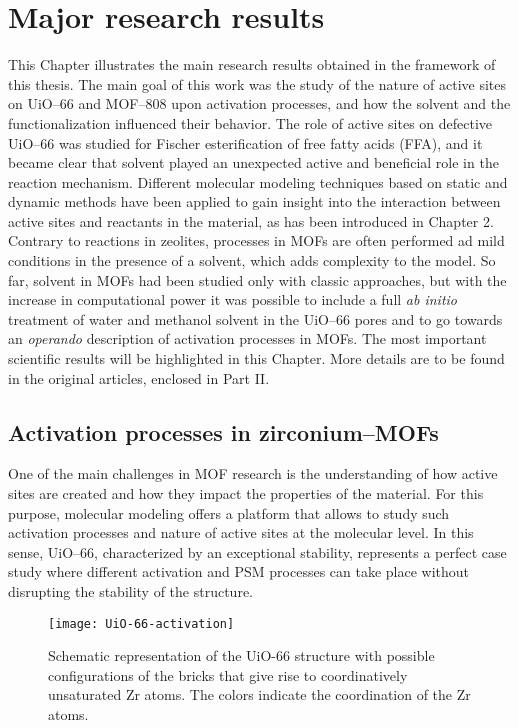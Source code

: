 \graphicspath{{figures/chapter3/}}
\renewcommand\evenpagerightmark{{\scshape\small Major research results}}
\renewcommand\oddpageleftmark{{\scshape\small Chapter 3}}

\hyphenation{}
\chapter[Major research results]%
{Major research results}
\label{ch3}
This Chapter illustrates the main research results obtained in the framework of this thesis. The main goal of this work was the study of the nature of active sites on UiO--66 and MOF--808 upon activation processes, and how the solvent and the functionalization influenced their behavior. The role of active sites on defective UiO--66 was studied for Fischer esterification of free fatty acids (FFA), and it became clear that solvent played an unexpected active and beneficial role in the reaction mechanism. Different molecular modeling techniques based on static and dynamic methods have been applied to gain insight into the interaction between active sites and reactants in the material, as has been introduced in Chapter 2. Contrary to reactions in zeolites, processes in MOFs are often performed ad mild conditions in the presence of a solvent, which adds complexity to the model. So far, solvent in MOFs had been studied only with classic approaches, but with the increase in computational power it was possible to include a full \textit{ab initio} treatment of water and methanol solvent in the UiO--66 pores and to go towards an \textit{operando} description of activation processes in MOFs. The most important scientific results will be highlighted in this Chapter. More details are to be found in the original articles, enclosed in Part II.

\section{Activation processes in zirconium--MOFs}
One of the main challenges in MOF research is the understanding of how active sites are created and how they impact the properties of the material. For this purpose, molecular modeling offers a platform that allows to study such activation processes and nature of active sites at the molecular level. In this sense, UiO--66, characterized by an exceptional stability, represents a perfect case study where different activation and PSM processes can take place without disrupting the stability of the structure. 
\begin{figure}[!htbp]
	\centering
	\texttt{[image: UiO-66-activation]}
	\caption{Schematic representation of the UiO-66 structure with possible configurations of the bricks that give rise to coordinatively unsaturated Zr atoms. The colors indicate the coordination of the Zr atoms.}
	\label{fig:UiO-66-activation}
\end{figure}
